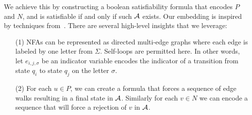 We achieve this by constructing a boolean satisfiability formula
that encodes \(P\) and \(N\),
and is satisfiable if and only if such \(\mathcal{A}\) exists.
Our embedding is inspired by techniques from~\cite{neider2018learning}.
There are several high-level insights that we leverage:
\begin{enumerate}
  \item[(1)]
    NFAs can be represented as directed multi-edge graphs
    where each edge is labeled by one letter from \(\Sigma\).
    Self-loops are permitted here.
    In other words, let \(e_{i, j, \sigma}\) be an indicator
    variable encodes the indicator of a transition from state \(q_i\)
    to state \(q_j\) on the letter \(\sigma\).

  \item[(2)]
    For each \(u \in P\),
    we can create a formula that forces a sequence of edge walks
    resulting in a final state in \(\mathcal{A}\).
    Similarly for each \(v \in N\) we can encode a sequence that will force
    a rejection of \(v\) in \(\mathcal{A}\).

\end{enumerate}

